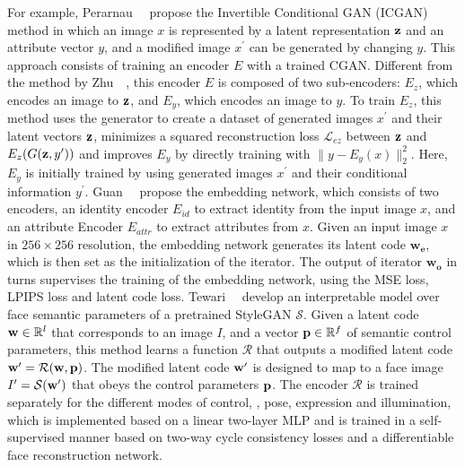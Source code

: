 For example, Perarnau~\etal~\cite{perarnau2016invertible} propose the Invertible Conditional GAN (ICGAN) method in which an image $x$ is represented by a latent representation $\mathbf{z}$ and an attribute vector $y$, and a modified image $x^{\prime}$ can be generated by changing $y$.
This approach consists of training an encoder $E$ with a trained CGAN. 
Different from the method by Zhu~\etal~\cite{zhu2016generative}, this encoder $E$ is composed of two sub-encoders: $E_{z}$, which encodes an image to $\mathbf{z}$, and $E_{y}$, which encodes an image to $y$. 
To train $E_{z}$, this method uses the generator to create a dataset of generated images $x^{\prime}$ and their latent vectors $\mathbf{z}$, 
minimizes a squared reconstruction loss $\mathcal{L}_{ez}$ between $\mathbf{z}$ and $E_{z}(G(\mathbf{z}, y^{\prime}))$ and improves $E_{y}$ by directly training with $\|y-E_{y}(x)\|_{2}^{2}$. 
Here, $E_{y}$ is initially trained by using generated images $x^{\prime}$ and their conditional information $y^{\prime}$.
Guan~\etal~\cite{guan2020faster} propose the embedding network, which consists of two encoders, an identity encoder $E_{id}$ to extract identity from the input image $x$, and an attribute Encoder $E_{attr}$ to extract attributes from $x$. 
Given an input image $x$ in $256 \times 256$ resolution, the embedding network generates its latent code $\mathbf{w_e}$, which is then set as the initialization of the iterator.
The output of iterator $\mathbf{w_o}$ in turns supervises the training of the embedding network, using the MSE loss, LPIPS loss and latent code loss.
Tewari~\etal~\cite{tewari2020stylerig} develop an interpretable model over face semantic parameters of a pretrained StyleGAN $\mathcal{S}$.
Given a latent code $\mathbf{w} \in \mathbb{R}^{l}$ that corresponds to an image $I$, and a vector $\mathbf{p} \in \mathbb{R}^f$ of semantic control parameters, this method learns a function $\mathcal{R}$ that outputs a modified latent code ${\mathbf{w}}^{\prime} = \mathcal{R}(\mathbf{w}, \mathbf{p})$. 
The modified latent code $\mathbf{w}^{\prime}$ is designed to map to a face image $I^{\prime} = \mathcal{S}({\mathbf{w}}^{\prime})$ that obeys the control parameters $\mathbf{p}$.
The encoder $\mathcal{R}$ is trained separately for the different modes of control, \ie, pose, expression and illumination, which is implemented based on a linear two-layer MLP and is trained in a self-supervised manner based on two-way cycle consistency losses and a differentiable face reconstruction network.

